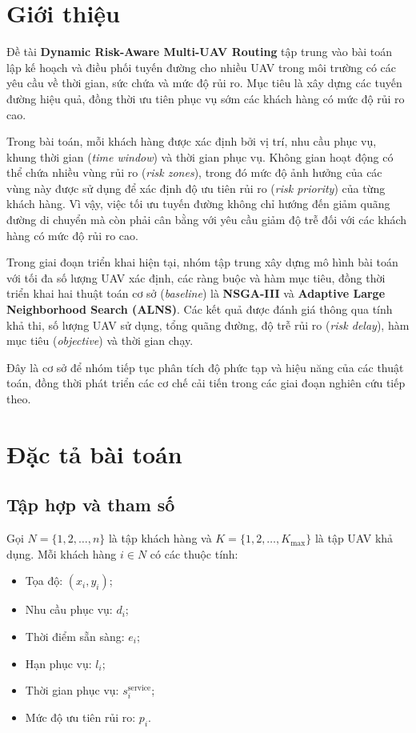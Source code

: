 \documentclass{article}
\begin{document}
\section{Giới thiệu}

Đề tài \textbf{Dynamic Risk-Aware Multi-UAV Routing} tập trung vào bài toán lập kế hoạch và điều phối tuyến đường cho nhiều UAV trong môi trường có các yêu cầu về thời gian, sức chứa và mức độ rủi ro. Mục tiêu là xây dựng các tuyến đường hiệu quả, đồng thời ưu tiên phục vụ sớm các khách hàng có mức độ rủi ro cao.

Trong bài toán, mỗi khách hàng được xác định bởi vị trí, nhu cầu phục vụ, khung thời gian (\textit{time window}) và thời gian phục vụ. Không gian hoạt động có thể chứa nhiều vùng rủi ro (\textit{risk zones}), trong đó mức độ ảnh hưởng của các vùng này được sử dụng để xác định độ ưu tiên rủi ro (\textit{risk priority}) của từng khách hàng. Vì vậy, việc tối ưu tuyến đường không chỉ hướng đến giảm quãng đường di chuyển mà còn phải cân bằng với yêu cầu giảm độ trễ đối với các khách hàng có mức độ rủi ro cao.

Trong giai đoạn triển khai hiện tại, nhóm tập trung xây dựng mô hình bài toán với tối đa số lượng UAV xác định, các ràng buộc và hàm mục tiêu, đồng thời triển khai hai thuật toán cơ sở (\textit{baseline}) là \textbf{NSGA-III} và \textbf{Adaptive Large Neighborhood Search (ALNS)}. Các kết quả được đánh giá thông qua tính khả thi, số lượng UAV sử dụng, tổng quãng đường, độ trễ rủi ro (\textit{risk delay}), hàm mục tiêu (\textit{objective}) và thời gian chạy.

Đây là cơ sở để nhóm tiếp tục phân tích độ phức tạp và hiệu năng của các thuật toán, đồng thời phát triển các cơ chế cải tiến trong các giai đoạn nghiên cứu tiếp theo.
\section{Đặc tả bài toán}

\subsection{Tập hợp và tham số}

Gọi $N = \{1, 2, \dots, n\}$ là tập khách hàng và $K = \{1, 2, \dots, K_{\max}\}$ là tập UAV khả dụng. Mỗi khách hàng $i \in N$ có các thuộc tính:
\begin{itemize}
    \item Tọa độ: $(x_i, y_i)$;
    \item Nhu cầu phục vụ: $d_i$;
    \item Thời điểm sẵn sàng: $e_i$;
    \item Hạn phục vụ: $l_i$;
    \item Thời gian phục vụ: $s_i^{\text{service}}$;
    \item Mức độ ưu tiên rủi ro: $p_i$.
\end{itemize}
\end{document}
